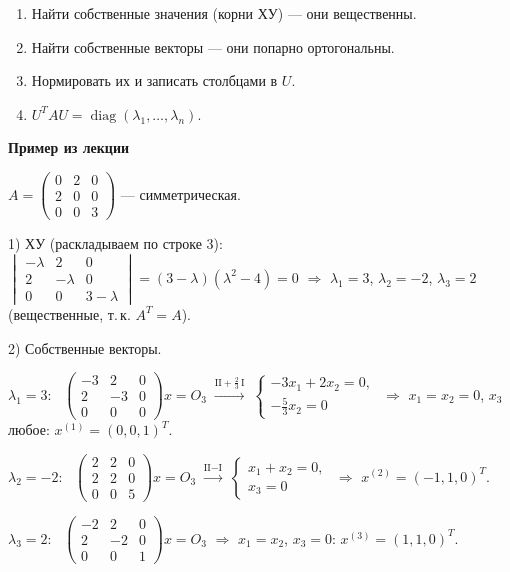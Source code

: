 \documentclass[a4paper,11pt]{article}
\DeclareMathOperator{\diag}{diag}
\newcommand{\gauss}[1]{\;\xrightarrow{\scriptstyle #1}\;}
\newcommand{\podr}[1]{\par\needspace{8\baselineskip}\medskip
  {\large\bfseries\textcolor{oprc!80!black}{#1}}\par\nopagebreak\smallskip}
\begin{document}
\begin{enumerate}[leftmargin=*]
  \item Найти собственные значения (корни ХУ) --- они вещественны.
  \item Найти собственные векторы --- они попарно ортогональны.
  \item Нормировать их и записать столбцами в $U$.
  \item $U^T A U = \diag(\lambda_1, \dots, \lambda_n)$.
\end{enumerate}

\podr{Пример из лекции}

$A = \begin{pmatrix} 0 & 2 & 0 \\ 2 & 0 & 0 \\ 0 & 0 & 3 \end{pmatrix}$ --- симметрическая.

1) ХУ (раскладываем по строке 3):
$\begin{vmatrix} -\lambda & 2 & 0 \\ 2 & -\lambda & 0 \\ 0 & 0 & 3 - \lambda \end{vmatrix} = (3 - \lambda)(\lambda^2 - 4) = 0$
$\Rightarrow$ $\lambda_1 = 3$, $\lambda_2 = -2$, $\lambda_3 = 2$ (вещественные, т.\,к. $A^T = A$).

2) Собственные векторы.

$\lambda_1 = 3$: \ $\begin{pmatrix} -3 & 2 & 0 \\ 2 & -3 & 0 \\ 0 & 0 & 0 \end{pmatrix} x = O_3
\gauss{\text{II} + \frac23\,\text{I}} \begin{cases} -3x_1 + 2x_2 = 0, \\ -\frac53 x_2 = 0 \end{cases}$
$\Rightarrow$ $x_1 = x_2 = 0$, $x_3$ любое: $x^{(1)} = (0, 0, 1)^T$.

$\lambda_2 = -2$: \ $\begin{pmatrix} 2 & 2 & 0 \\ 2 & 2 & 0 \\ 0 & 0 & 5 \end{pmatrix} x = O_3
\gauss{\text{II} - \text{I}} \begin{cases} x_1 + x_2 = 0, \\ x_3 = 0 \end{cases}$ $\Rightarrow$ $x^{(2)} = (-1, 1, 0)^T$.

$\lambda_3 = 2$: \ $\begin{pmatrix} -2 & 2 & 0 \\ 2 & -2 & 0 \\ 0 & 0 & 1 \end{pmatrix} x = O_3$ $\Rightarrow$ $x_1 = x_2$, $x_3 = 0$:
$x^{(3)} = (1, 1, 0)^T$.
\end{document}
